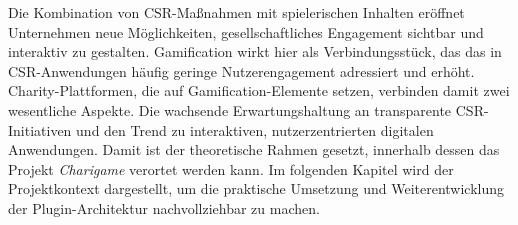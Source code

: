 Die Kombination von CSR-Maßnahmen mit spielerischen Inhalten eröffnet Unternehmen neue Möglichkeiten, gesellschaftliches Engagement sichtbar und interaktiv zu gestalten.
Gamification wirkt hier als Verbindungsstück, das das in CSR-Anwendungen häufig geringe Nutzerengagement adressiert und erhöht.
Charity-Plattformen, die auf Gamification-Elemente setzen, verbinden damit zwei wesentliche Aspekte.
Die wachsende Erwartungshaltung an transparente CSR-Initiativen und den Trend zu interaktiven, nutzerzentrierten digitalen Anwendungen.
Damit ist der theoretische Rahmen gesetzt, innerhalb dessen das Projekt \textit{Charigame} verortet werden kann.
Im folgenden Kapitel wird der Projektkontext dargestellt, um die praktische Umsetzung und Weiterentwicklung der \gls{Plugin}-Architektur nachvollziehbar zu machen.